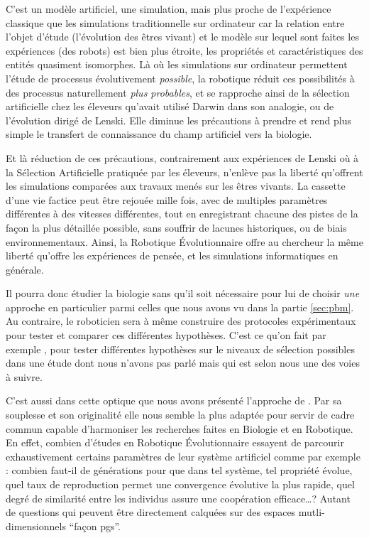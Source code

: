 C'est un modèle artificiel, une simulation, mais plus proche de l'expérience classique que les simulations traditionnelle sur ordinateur car la relation entre l'objet d'étude (l'évolution des êtres vivant) et le modèle sur lequel sont faites les expériences (des robots) est bien plus étroite, les propriétés et caractéristiques des entités quasiment isomorphes. Là où les simulations sur ordinateur permettent l'étude de processus évolutivement \emph{possible}, la robotique réduit ces possibilités à des processus naturellement \emph{plus probables}, et se rapproche ainsi de la sélection artificielle chez les éleveurs qu'avait utilisé Darwin dans son analogie, ou de l'évolution dirigé de Lenski. Elle diminue les précautions à prendre et rend plus simple le transfert de connaissance du champ artificiel vers la biologie.

Et là réduction de ces précautions, contrairement aux expériences de Lenski où à la Sélection Artificielle pratiquée par les éleveurs, n'enlève pas la liberté qu'offrent les simulations comparées aux travaux menés sur les êtres vivants. La cassette d'une vie factice peut être rejouée mille fois, avec de multiples paramètres différentes à des vitesses différentes, tout en enregistrant chacune des pistes de la façon la plus détaillée possible, sans souffrir de lacunes historiques, ou de biais environnementaux. Ainsi, la Robotique \'Evolutionnaire offre au chercheur la même liberté qu'offre les expériences de pensée, et les simulations informatiques en générale. 

Il pourra donc étudier la biologie sans qu'il soit nécessaire pour lui de choisir \emph{une} approche en particulier parmi celles que nous avons vu dans la partie \ref{sec:pbm}. Au contraire, le roboticien sera à même construire des protocoles expérimentaux  pour tester et comparer ces différentes hypothèses. C'est ce qu'on fait par exemple \cite{waibel09geneticteamcompositionlevelselectionevolutioncooperation}, pour tester différentes hypothèses sur le niveaux de sélection possibles dans une étude dont nous n'avons pas parlé mais qui est selon nous une des voies à suivre.

C'est aussi dans cette optique que nous avons présenté l'approche de \cite{godfrey2009darwinian}. Par sa souplesse et son originalité elle nous semble la plus adaptée pour servir de cadre commun capable d'harmoniser les recherches faites en Biologie et en Robotique. En effet, combien d'études en Robotique \'Evolutionnaire essayent de parcourir exhaustivement certains paramètres de leur système artificiel comme par exemple : combien faut-il de générations pour que dans tel système, tel propriété évolue, quel taux de reproduction permet une convergence évolutive la plus rapide, quel degré de similarité entre les individus assure une coopération efficace\dots? Autant de questions qui peuvent être directement calquées sur des espaces mutli-dimensionnels ``façon pgs''. 

